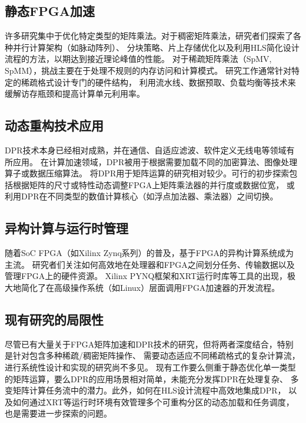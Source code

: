 \subsection{静态FPGA加速}

许多研究集中于优化特定类型的矩阵乘法。对于稠密矩阵乘法，研究者们探索了各种并行计算架构（如脉动阵列）、
分块策略、片上存储优化以及利用HLS简化设计流程的方法，以期达到接近理论峰值的性能\cite{de2020flexible,pucscacsu2024systolic}。
对于稀疏矩阵乘法（SpMV, SpMM），挑战主要在于处理不规则的内存访问和计算模式。
研究工作通常针对特定的稀疏格式设计专门的硬件结构，
利用流水线、数据预取、负载均衡等技术来缓解访存瓶颈和提高计算单元利用率\cite{dorrance2014scalable}。

\subsection{动态重构技术应用}

DPR技术本身已经相对成熟，并在通信、自适应滤波、软件定义无线电等领域有所应用\cite{bobda2007introduction}。
在计算加速领域，DPR被用于根据需要加载不同的加密算法、图像处理算子或数据压缩算法\cite{gonzalez2003using,ram2020dynamic}。
将DPR用于矩阵运算的研究相对较少。可行的初步探索包括根据矩阵的尺寸或特性动态调整FPGA上矩阵乘法器的并行度或数据位宽，
或利用DPR在不同类型的数值计算核心（如浮点加法器、乘法器）之间切换。

\subsection{异构计算与运行时管理}

随着SoC FPGA（如Xilinx Zynq系列）的普及，基于FPGA的异构计算系统成为主流。
研究者们关注如何高效地在处理器和FPGA之间划分任务、传输数据以及管理FPGA上的硬件资源\cite{mitola2002software}。
Xilinx PYNQ框架和XRT运行时库等工具的出现，极大地简化了在高级操作系统（如Linux）层面调用FPGA加速器的开发流程。

\subsection{现有研究的局限性}

尽管已有大量关于FPGA矩阵加速和DPR技术的研究，但将两者深度结合，特别是针对包含多种稀疏/稠密矩阵操作、
需要动态适应不同稀疏格式的复杂计算流，进行系统性设计和实现的研究尚不多见。
现有工作要么侧重于静态优化单一类型的矩阵运算，要么DPR的应用场景相对简单，未能充分发挥DPR在处理复杂、
多变矩阵计算任务流中的潜力。此外，如何在HLS设计流程中高效地集成DPR，
以及如何通过XRT等运行时环境有效管理多个可重构分区的动态加载和任务调度，也是需要进一步探索的问题。

